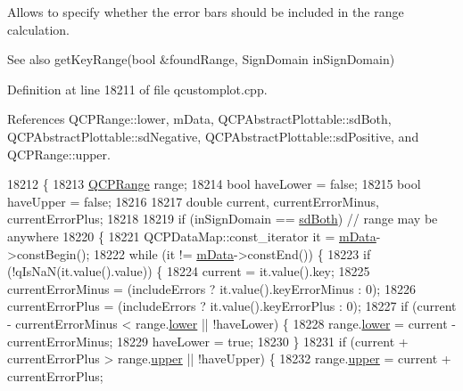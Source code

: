 Allows to specify whether the error bars should be included in the range calculation.

\begin{DoxySeeAlso}{See also}
get\+Key\+Range(bool \&found\+Range, Sign\+Domain in\+Sign\+Domain) 
\end{DoxySeeAlso}


Definition at line 18211 of file qcustomplot.\+cpp.



References Q\+C\+P\+Range\+::lower, m\+Data, Q\+C\+P\+Abstract\+Plottable\+::sd\+Both, Q\+C\+P\+Abstract\+Plottable\+::sd\+Negative, Q\+C\+P\+Abstract\+Plottable\+::sd\+Positive, and Q\+C\+P\+Range\+::upper.


\begin{DoxyCode}
18212                                                          \{
18213   \hyperlink{class_q_c_p_range}{QCPRange} range;
18214   \textcolor{keywordtype}{bool} haveLower = \textcolor{keyword}{false};
18215   \textcolor{keywordtype}{bool} haveUpper = \textcolor{keyword}{false};
18216 
18217   \textcolor{keywordtype}{double} current, currentErrorMinus, currentErrorPlus;
18218 
18219   \textcolor{keywordflow}{if} (inSignDomain == \hyperlink{class_q_c_p_abstract_plottable_a661743478a1d3c09d28ec2711d7653d8a082b98cfb91a7363a3b5cd17b0c1cd60}{sdBoth}) \textcolor{comment}{// range may be anywhere}
18220   \{
18221     QCPDataMap::const\_iterator it = \hyperlink{class_q_c_p_graph_a8457c840f69a0ac49f61d30a509c5d08}{mData}->constBegin();
18222     \textcolor{keywordflow}{while} (it != \hyperlink{class_q_c_p_graph_a8457c840f69a0ac49f61d30a509c5d08}{mData}->constEnd()) \{
18223       \textcolor{keywordflow}{if} (!qIsNaN(it.value().value)) \{
18224         current = it.value().key;
18225         currentErrorMinus = (includeErrors ? it.value().keyErrorMinus : 0);
18226         currentErrorPlus = (includeErrors ? it.value().keyErrorPlus : 0);
18227         \textcolor{keywordflow}{if} (current - currentErrorMinus < range.\hyperlink{class_q_c_p_range_aa3aca3edb14f7ca0c85d912647b91745}{lower} || !haveLower) \{
18228           range.\hyperlink{class_q_c_p_range_aa3aca3edb14f7ca0c85d912647b91745}{lower} = current - currentErrorMinus;
18229           haveLower = \textcolor{keyword}{true};
18230         \}
18231         \textcolor{keywordflow}{if} (current + currentErrorPlus > range.\hyperlink{class_q_c_p_range_ae44eb3aafe1d0e2ed34b499b6d2e074f}{upper} || !haveUpper) \{
18232           range.\hyperlink{class_q_c_p_range_ae44eb3aafe1d0e2ed34b499b6d2e074f}{upper} = current + currentErrorPlus;

\end{DoxyCode}
